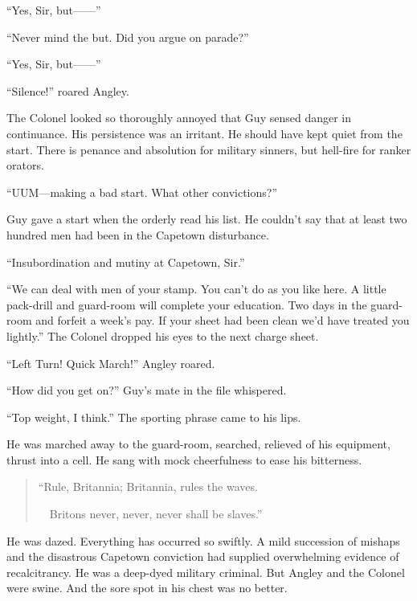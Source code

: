 ``Yes, Sir, but------''

``Never mind the but. Did you argue on parade?''

``Yes, Sir, but------''

``Silence!'' roared Angley.

The Colonel looked so thoroughly annoyed that Guy sensed danger 
in continuance. His persistence was an irritant. He should have 
kept quiet from the start. There is penance and absolution for 
military sinners, but hell-fire for ranker orators.

``UUM---making a bad start. What other convictions?''

Guy gave a start when the orderly read his list. He couldn't say 
that at least two hundred men had been in the Capetown disturbance.

``Insubordination and mutiny at Capetown, Sir.''

``We can deal with men of your stamp. You can't do as you like 
here. A little pack-drill and guard-room will complete your 
education. Two days in the guard-room and forfeit a week's pay. 
If your sheet had been clean we'd have treated you lightly.'' The 
Colonel dropped his eyes to the next charge sheet.

``Left Turn! Quick March!'' Angley roared.

``How did you get on?'' Guy's mate in the file whispered.

``Top weight, I think.'' The sporting phrase came to his lips.

He was marched away to the guard-room, searched, relieved of his 
equipment, thrust into a cell. He sang with mock cheerfulness to 
ease his bitterness.

\begin{verse}
``Rule, Britannia; Britannia, rules the waves. 

\ \ Britons never, never, never shall be slaves.''
\end{verse}

He was dazed. Everything has occurred so swiftly. A mild succession of 
mishaps and the disastrous Capetown conviction had supplied overwhelming 
evidence of recalcitrancy. He was a deep-dyed military criminal. But 
Angley and the Colonel were swine. And the sore spot in his chest was 
no better.